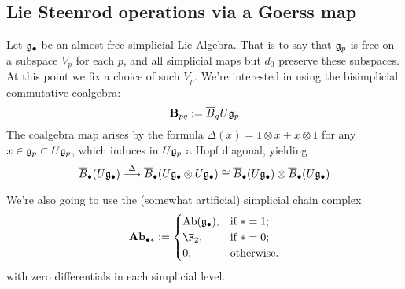 \documentclass[10pt]{article}
\begin{document}
\begin{Lie Steenrods satisfy the Adem relation}

\pagebreak
\section{Lie Steenrod operations via a Goerss map}
Let $\mathfrak{g}_\bullet$ be an almost free simplicial Lie Algebra. That is to say that $\mathfrak{g}_p$ is free on a subspace $V_p$ for each $p$, and all simplicial maps but $d_0$ preserve these subspaces. At this point we fix a choice of such $V_p$.
We're interested in using the bisimplicial commutative coalgebra:
\[\textbf{B}_{pq}:=\overline{B}_q U\mathfrak{g}_p\]
The coalgebra map arises by the formula $\Delta(x)=1\otimes x+x\otimes 1$ for any $x\in\mathfrak{g}_p\subset U\mathfrak{g}_p$, which induces in $U\mathfrak{g}_p$ a Hopf diagonal, yielding
\[\overline{B}_\bullet (U\mathfrak{g}_\bullet)\overset{\Delta}{\longrightarrow}\overline{B}_\bullet (U\mathfrak{g}_\bullet\otimes U\mathfrak{g}_\bullet)\cong\overline{B}_\bullet (U\mathfrak{g}_\bullet)\otimes \overline{B}_\bullet (U\mathfrak{g}_\bullet)\]


We're also going to use the (somewhat artificial) simplicial chain complex
\[\textbf{Ab}_{\bullet *}:=\begin{cases}
\textup{Ab}(\frakg_\bullet),&\textup{if }*=1;\\
\F_2,&\textup{if }*=0;
\\0,&\textup{otherwise.}
\end{cases}
\]
with zero differentials in each simplicial level.


\end{Lie Steenrods satisfy the Adem relation}
\end{document}
